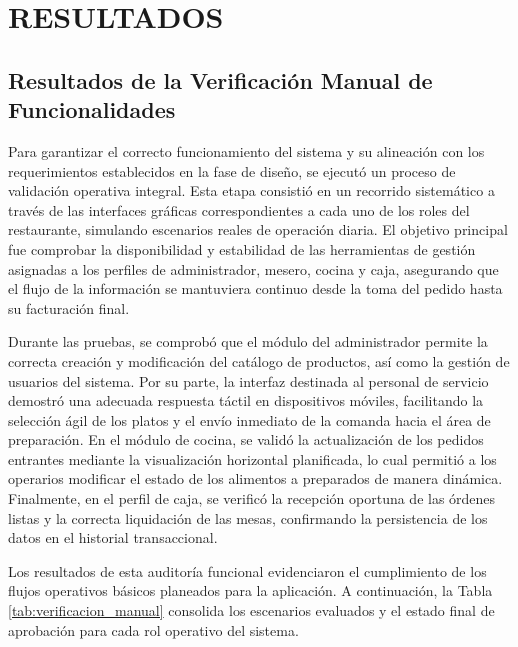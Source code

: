 \newpage
\chapter{RESULTADOS}
\section{Resultados de la Verificación Manual de Funcionalidades}

Para garantizar el correcto funcionamiento del sistema y su alineación con los requerimientos establecidos en la fase de diseño, se ejecutó un proceso de validación operativa integral. Esta etapa consistió en un recorrido sistemático a través de las interfaces gráficas correspondientes a cada uno de los roles del restaurante, simulando escenarios reales de operación diaria. El objetivo principal fue comprobar la disponibilidad y estabilidad de las herramientas de gestión asignadas a los perfiles de administrador, mesero, cocina y caja, asegurando que el flujo de la información se mantuviera continuo desde la toma del pedido hasta su facturación final.

Durante las pruebas, se comprobó que el módulo del administrador permite la correcta creación y modificación del catálogo de productos, así como la gestión de usuarios del sistema. Por su parte, la interfaz destinada al personal de servicio demostró una adecuada respuesta táctil en dispositivos móviles, facilitando la selección ágil de los platos y el envío inmediato de la comanda hacia el área de preparación. En el módulo de cocina, se validó la actualización de los pedidos entrantes mediante la visualización horizontal planificada, lo cual permitió a los operarios modificar el estado de los alimentos a preparados de manera dinámica. Finalmente, en el perfil de caja, se verificó la recepción oportuna de las órdenes listas y la correcta liquidación de las mesas, confirmando la persistencia de los datos en el historial transaccional.

Los resultados de esta auditoría funcional evidenciaron el cumplimiento de los flujos operativos básicos planeados para la aplicación. A continuación, la Tabla \ref{tab:verificacion_manual} consolida los escenarios evaluados y el estado final de aprobación para cada rol operativo del sistema.

